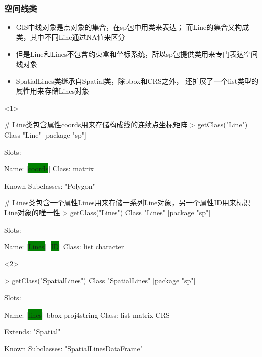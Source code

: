 \subsubsection{空间线类}
\begin{frame}[t,fragile]{\subsecname}{\subsubsecname}
\begin{itemize}
\item<1-> GIS中线对象是点对象的集合，在sp包中用类来表达；
而Line的集合又构成类，其中不同Line通过NA值来区分
\item<2-> 但是Line和Lines不包含约束盒和坐标系统，所以sp包提供类用来专门表达空间线对象
\item<2-> SpatialLines类继承自Spatial类，除bbox和CRS之外，
还扩展了一个list类型的属性用来存储Lines对象
\end{itemize}

\begin{overlayarea}{\textwidth}{\textheight}
\begin{onlyenv}<1>
\begin{rcode}
# Line类包含属性coords用来存储构成线的连续点坐标矩阵
> getClass("Line")
Class "Line" [package "sp"]

Slots:
             
Name:  |\colorbox{green}{coords}|
Class: matrix

Known Subclasses: "Polygon"

# Lines类包含一个属性Lines用来存储一系列Line对象，另一个属性ID用来标识Line对象的唯一性
> getClass("Lines")
Class "Lines" [package "sp"]

Slots:
                          
Name:      |\colorbox{green}{Lines}|        |\colorbox{green}{ID}|
Class:      list character
\end{rcode}
\end{onlyenv}

\begin{onlyenv}<2>
\begin{rcode}
> getClass("SpatialLines")
Class "SpatialLines" [package "sp"]

Slots:
                                          
Name:        |\colorbox{green}{lines}|        bbox proj4string
Class:        list      matrix         CRS

Extends: "Spatial"

Known Subclasses: "SpatialLinesDataFrame"
\end{rcode}
\end{onlyenv}


\end{overlayarea}
\end{frame}
